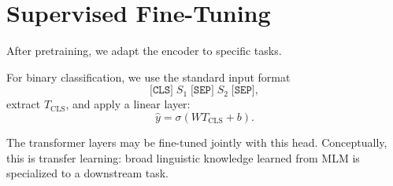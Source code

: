 \section{Supervised Fine-Tuning}
\medskip

After pretraining, we adapt the encoder to specific tasks.

For binary classification, we use the standard input format
\[
\texttt{[CLS]} \; S_1 \; \texttt{[SEP]} \; S_2 \; \texttt{[SEP]},
\]
extract $T_{\text{CLS}}$, and apply a linear layer:
\[
\hat{y} = \sigma(W T_{\text{CLS}} + b).
\]

The transformer layers may be fine-tuned jointly with this head. Conceptually, this is transfer learning: broad linguistic knowledge learned from MLM is specialized to a downstream task.

\bigskip


